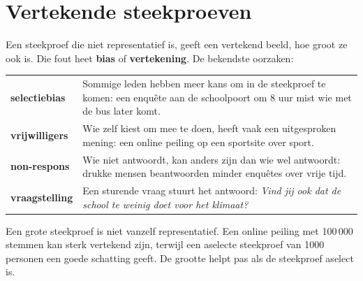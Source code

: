 \begin{oefeningen}

\end{oefeningen}

\section{Vertekende steekproeven}

Een steekproef die niet representatief is, geeft een vertekend beeld, hoe groot ze ook is. Die fout heet \textbf{bias} of \textbf{vertekening}. De bekendste oorzaken:

{\renewcommand{\arraystretch}{1.4}%
\begin{tabular}{@{}>{\RaggedRight\arraybackslash\bfseries}p{3.6cm}>{\RaggedRight\arraybackslash}p{12cm}@{}}
selectiebias & Sommige leden hebben meer kans om in de steekproef te komen: een enquête aan de schoolpoort om 8 uur mist wie met de bus later komt. \\
vrijwilligers & Wie zelf kiest om mee te doen, heeft vaak een uitgesproken mening: een online peiling op een sportsite over sport. \\
non-respons & Wie niet antwoordt, kan anders zijn dan wie wel antwoordt: drukke mensen beantwoorden minder enquêtes over vrije tijd. \\
vraagstelling & Een sturende vraag stuurt het antwoord: \textit{Vind jij ook dat de school te weinig doet voor het klimaat?}
\end{tabular}\par}

Een grote steekproef is niet vanzelf representatief. Een online peiling met 100\,000 stemmen kan sterk vertekend zijn, terwijl een aselecte steekproef van 1000 personen een goede schatting geeft. De grootte helpt pas als de steekproef aselect is.


